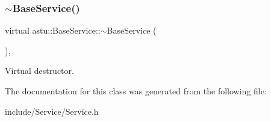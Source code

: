 \subsubsection{\texorpdfstring{$\sim$\+Base\+Service()}{~BaseService()}}
{\footnotesize\ttfamily virtual astu\+::\+Base\+Service\+::$\sim$\+Base\+Service (\begin{DoxyParamCaption}{ }\end{DoxyParamCaption})\hspace{0.3cm}{\ttfamily [inline]}, {\ttfamily [virtual]}}

Virtual destructor. 

The documentation for this class was generated from the following file\+:\begin{DoxyCompactItemize}
\item 
include/\+Service/Service.\+h\end{DoxyCompactItemize}
